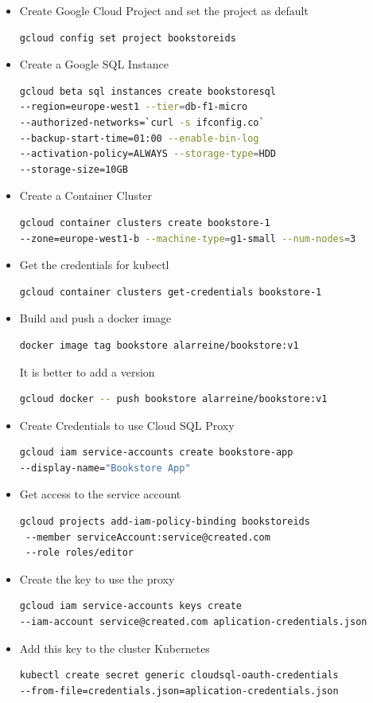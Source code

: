 \documentclass[a4paper]{article}
\begin{document}
\begin{itemize}
\item Create Google Cloud Project and set the project as default
\begin{lstlisting}[language=bash]
gcloud config set project bookstoreids
\end{lstlisting}

\item Create a Google SQL Instance
\begin{lstlisting}[language=bash]
gcloud beta sql instances create bookstoresql 
--region=europe-west1 --tier=db-f1-micro 
--authorized-networks=`curl -s ifconfig.co` 
--backup-start-time=01:00 --enable-bin-log 
--activation-policy=ALWAYS --storage-type=HDD 
--storage-size=10GB
\end{lstlisting}
\item Create a Container Cluster
\begin{lstlisting}[language=bash]
gcloud container clusters create bookstore-1 
--zone=europe-west1-b --machine-type=g1-small --num-nodes=3
\end{lstlisting}
\item Get the credentials for kubectl
\begin{lstlisting}[language=bash]
gcloud container clusters get-credentials bookstore-1
\end{lstlisting}
\item Build and push a docker image
\begin{lstlisting}[language=bash]
docker image tag bookstore alarreine/bookstore:v1
\end{lstlisting}
It is better to add a version
\begin{lstlisting}[language=bash]
gcloud docker -- push bookstore alarreine/bookstore:v1
\end{lstlisting}
\item Create Credentials to use Cloud SQL Proxy
\begin{lstlisting}[language=bash]
gcloud iam service-accounts create bookstore-app 
--display-name="Bookstore App"
\end{lstlisting}    
\item Get access to the service account
\begin{lstlisting}[language=bash]
gcloud projects add-iam-policy-binding bookstoreids 
 --member serviceAccount:service@created.com 
 --role roles/editor
\end{lstlisting}
\item Create the key to use the proxy
\begin{lstlisting}[language=bash]
gcloud iam service-accounts keys create
--iam-account service@created.com aplication-credentials.json
\end{lstlisting}
\item Add this key to the cluster Kubernetes
\begin{lstlisting}[language=bash]
kubectl create secret generic cloudsql-oauth-credentials 
--from-file=credentials.json=aplication-credentials.json
\end{lstlisting}


\end{itemize}
\end{document}
